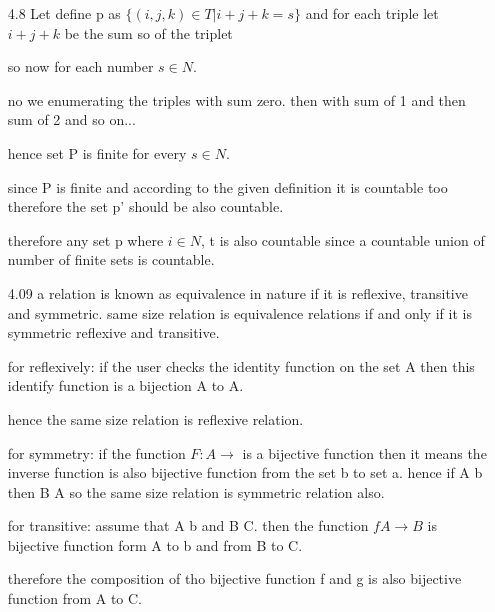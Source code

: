 \documentclass[11pt]{article}
\theoremstyle{thmstyle}
\begin{document}

\thispagestyle{firstpage} %

\setlength{\abovedisplayskip}{20pt} %
\setlength{\belowdisplayskip}{20pt} %





\begin{itemize}\setlength{\itemsep}{1em} %
\item[4.8] Let define p as $\{ (i,j,k) \in T | i+j+k = s \}$ and for each triple let $i+j+k$ be the sum so of the triplet  

so now for each number $s \in N$.

no we enumerating the triples with sum zero. then with sum of 1 and then sum of 2 and so on...

hence set P is finite for every $s \in N$.

since P is finite and according to the given definition it is countable too therefore the set p' should be also countable. 

therefore any set p where $i \in N$, t is also countable since a countable union of number of finite sets is countable. 

\item[4.09] a relation is known as equivalence in nature if it is reflexive, transitive and symmetric. same size relation is equivalence relations if and only if it is symmetric reflexive and transitive. 

for reflexively: if the user checks the identity function on the set A then this identify function is a bijection A to A. 

hence the same size relation is reflexive relation.

for symmetry: if the function $F : A \longrightarrow $ is a bijective function then it means the inverse function is also bijective function from the set b to set a.
 hence if A b then B A so the same size relation is symmetric relation also. 
 
 for transitive:  assume that A b and B C. then the function $ f A \longrightarrow B$ is bijective function form A to b and from B to C. 
 
 therefore the composition of tho bijective function f and g is also bijective function from A to C. 
 

\end{itemize}
\end{document}
